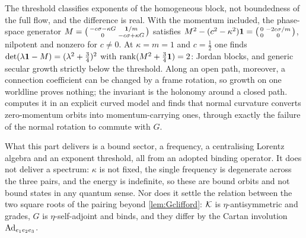 The threshold classifies exponents of the homogeneous block, not boundedness of the full flow, and the difference is real. With the momentum
included, the phase-space generator $M=\bigl(\begin{smallmatrix}-c\sigma-\kappa G&\mathbf 1/m\\0&-c\sigma+\kappa G\end{smallmatrix}\bigr)$ satisfies
$M^2-(c^2-\kappa^2)\mathbf 1=\bigl(\begin{smallmatrix}0&-2c\sigma/m\\0&0\end{smallmatrix}\bigr)$, nilpotent and nonzero for $c\neq0$. At $\kappa=m=1$ and
$c=\tfrac12$ one finds $\det(\lambda\mathbf 1-M)=(\lambda^2+\tfrac34)^2$ with $\operatorname{rank}(M^2+\tfrac34\mathbf 1)=2$: Jordan blocks, and generic secular growth strictly
below the threshold. Along an open path, moreover, a connection coefficient can be changed by a frame rotation, so growth on one worldline
proves nothing; the invariant is the holonomy around a closed path.  computes it in an explicit curved model and finds that
normal curvature converts zero-momentum orbits into momentum-carrying ones, through exactly the failure of the normal rotation to commute with
$G$.

What this part delivers is a bound sector, a frequency, a centralising Lorentz algebra and an exponent threshold, all from an adopted binding
operator. It does not deliver a spectrum: $\kappa$ is not fixed, the single frequency is degenerate across the three pairs, and the energy is
indefinite, so these are bound orbits and not bound states in any quantum sense. Nor does it settle the relation between the two square roots of
the pairing beyond \cref{lem:Gclifford}: $\mathcal K$ is $\eta$-antisymmetric and grades, $G$ is $\eta$-self-adjoint and binds, and they differ by the
Cartan involution $\operatorname{Ad}_{e_1e_2e_3}$.
